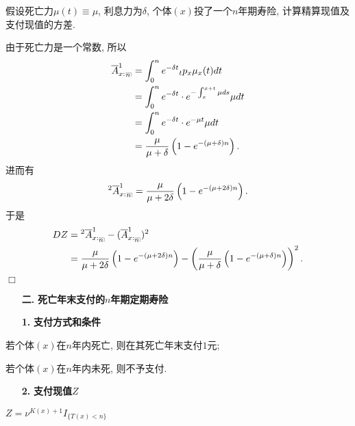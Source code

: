 \documentclass[a4paper,openany, 10pt]{ctexbook}
\makeatletter
\newcommand{\hei}{\CJKfamily{hei}}      %
\def\qed{\hfill$\Box$\medskip}
\DeclareRobustCommand{\annu}[1]{_{%
    \def\arraystretch{0}%
    \setlength\arraycolsep{1pt}%
    \setlength\arrayrulewidth{.2pt}%
    \begin{array}[b]{@{}c|}\hline
        \\[\arraycolsep]%
        \scriptstyle #1%
    \end{array}%
}}
\makeatother
\begin{document}
\begin{example}
    假设死亡力$\mu(t) \equiv \mu $, 利息力为$\delta$, 个体$(x)$投了一个$n$年期寿险, 计算精算现值及支付现值的方差.
\end{example}

\solution 由于死亡力是一个常数, 所以
\begin{align*}
    \overline{A}_{x:}^1{}_{\annu{n}} & = \int_0^n{e^{-\delta t}{}_tp_x\mu_x(t)dt}                        \\
                                & = \int_0^n{e^{-\delta t}\cdot e^{-\int_{x}^{x+t} \mu ds}\mu dt}   \\
                                & = \int_0^n{e^{-\delta t}\cdot e^{-\mu t}\mu dt}                   \\
                                & = \frac{\mu}{\mu + \delta} \left(1 - e^{-(\mu + \delta)n} \right).
\end{align*}
进而有
\begin{align*}
    ^2\overline{A}_{x:}^1{}_{\annu{n}}= \frac{\mu}{\mu + 2\delta} \left(1 - e^{-(\mu + 2\delta)n} \right).
\end{align*}
于是
\begin{align*}
    DZ& = {}^2\overline{A}_{x:\annu{n}}^1 - (\overline{A}_{x:\annu{n}}^1)^2\\
     &= \frac{\mu}{\mu + 2\delta} \left(1 - e^{-(\mu + 2\delta)n} \right) - \left(\frac{\mu}{\mu + \delta} \left(1 - e^{-(\mu + \delta)n} \right)\right)^2.
\end{align*}
\qed

\begin{itemize}
    \item[{\bf\hei 二.}]{\bf\hei 死亡年末支付的$n$年期定期寿险}
\end{itemize}
\begin{itemize}
    \item[{\bf\hei 1.}]{\bf\hei 支付方式和条件}
\end{itemize}

若个体$(x)$在$n$年内死亡, 则在其死亡年末支付$1$元; 

若个体$(x)$在$n$年内未死, 则不予支付.

\begin{itemize}
    \item[{\bf\hei 2.}]{\bf\hei 支付现值$Z$}
\end{itemize}

$Z=\nu^{K(x)+1}I_{\{T(x)<n\}}$
\end{document}
